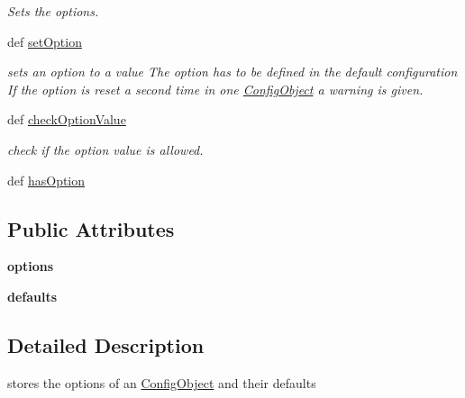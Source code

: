 \begin{CompactItemize}
\begin{CompactList}\small\item\em Sets the options. \item\end{CompactList}\item 
def \hyperlink{classtools_1_1XMLConfigParser_1_1OptionSet_ed3b8e8b77f780936f38389ab833f5ff}{setOption}
\begin{CompactList}\small\item\em sets an option to a value The option has to be defined in the default configuration If the option is reset a second time in one \hyperlink{classtools_1_1XMLConfigParser_1_1ConfigObject}{ConfigObject} a warning is given. \item\end{CompactList}\item 
def \hyperlink{classtools_1_1XMLConfigParser_1_1OptionSet_118681455ca2ff1e108084dd04452802}{checkOptionValue}
\begin{CompactList}\small\item\em check if the option value is allowed. \item\end{CompactList}\item 
def \hyperlink{classtools_1_1XMLConfigParser_1_1OptionSet_66effebc086caf0e5494f51502455f27}{hasOption}
\end{CompactItemize}
\subsection*{Public Attributes}
\begin{CompactItemize}
\item 
\hypertarget{classtools_1_1XMLConfigParser_1_1OptionSet_25ca2ef97315f87f05e8353ebff49537}{
\textbf{options}}
\label{classtools_1_1XMLConfigParser_1_1OptionSet_25ca2ef97315f87f05e8353ebff49537}

\item 
\hypertarget{classtools_1_1XMLConfigParser_1_1OptionSet_d17cc4d3ac989f378d3a06210775edaa}{
\textbf{defaults}}
\label{classtools_1_1XMLConfigParser_1_1OptionSet_d17cc4d3ac989f378d3a06210775edaa}

\end{CompactItemize}


\subsection{Detailed Description}
stores the options of an \hyperlink{classtools_1_1XMLConfigParser_1_1ConfigObject}{ConfigObject} and their defaults 

